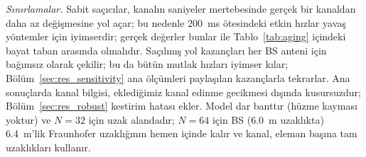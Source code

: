 \emph{Sınırlamalar.} Sabit saçıcılar, kanalın saniyeler mertebesinde gerçek bir kanaldan daha az değişmesine yol açar; bu nedenle 200~ms ötesindeki etkin hızlar yavaş yöntemler için iyimserdir; gerçek değerler bunlar ile Tablo~\ref{tab:aging} içindeki bayat taban arasında olmalıdır. Saçılmış yol kazançları her BS anteni için bağımsız olarak çekilir; bu da bütün mutlak hızları iyimser kılar; Bölüm~\ref{sec:res_sensitivity} ana ölçümleri paylaşılan kazançlarla tekrarlar. Ana sonuçlarda kanal bilgisi, eklediğimiz kanal edinme gecikmesi dışında kusursuzdur; Bölüm~\ref{sec:res_robust} kestirim hatası ekler. Model dar banttır (hüzme kayması yoktur) ve $N=32$ için uzak alandadır; $N=64$ için BS (6.0~m uzaklıkta) 6.4~m'lik Fraunhofer uzaklığının hemen içinde kalır ve kanal, eleman başına tam uzaklıkları kullanır.
